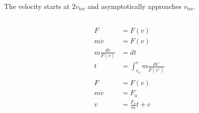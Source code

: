 \documentclass{article}
\begin{document}
The velocity starts at $2 v_\text{ter}$ and asymptotically approaches $v_\text{ter}$.

\setcounter{subsection}{6}
\subsection{}

\begin{align*}
  F                  & = F(v)                                     \\
  m \dot{v}          & = F(v)                                     \\
  m \frac{d v}{F(v)} & = d t                                      \\
  t                  & = \int_{v_\text{o}}^v m \frac{d v'}{F(v')} \\ \\
  F                  & = F(v)                                     \\
  m \dot{v}          & = F_\text{o}                               \\
  v                  & = \frac{F_\text{o}}{m} t + c
\end{align*}

\setcounter{subsection}{10}
\subsection{}
\end{document}
